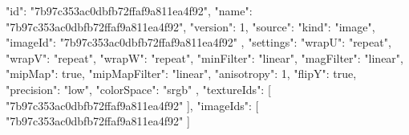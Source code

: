 {
  "id": "7b97c353ac0dbfb72ffaf9a811ea4f92",
  "name": "7b97c353ac0dbfb72ffaf9a811ea4f92",
  "version": 1,
  "source": {
    "kind": "image",
    "imageId": "7b97c353ac0dbfb72ffaf9a811ea4f92"
  },
  "settings": {
    "wrapU": "repeat",
    "wrapV": "repeat",
    "wrapW": "repeat",
    "minFilter": "linear",
    "magFilter": "linear",
    "mipMap": true,
    "mipMapFilter": "linear",
    "anisotropy": 1,
    "flipY": true,
    "precision": "low",
    "colorSpace": "srgb"
  },
  "textureIds": [
    "7b97c353ac0dbfb72ffaf9a811ea4f92"
  ],
  "imageIds": [
    "7b97c353ac0dbfb72ffaf9a811ea4f92"
  ]
}
